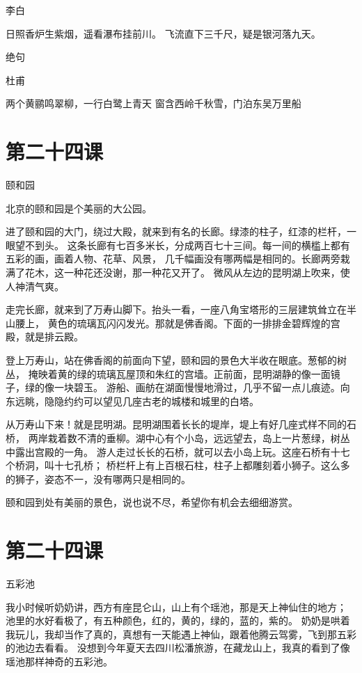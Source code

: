 \documentclass[12pt,UTF8]{ctexbook}
\begin{document}
李白

日照香炉生紫烟，遥看瀑布挂前川。
飞流直下三千尺，疑是银河落九天。

绝句

杜甫

两个黄鹂鸣翠柳，一行白鹭上青天
窗含西岭千秋雪，门泊东吴万里船

\section{第二十四课}

颐和园

北京的颐和园是个美丽的大公园。

进了颐和园的大门，绕过大殿，就来到有名的长廊。绿漆的柱子，红漆的栏杆，一眼望不到头。
这条长廊有七百多米长，分成两百七十三间。每一间的横槛上都有五彩的画，画着人物、花草、风景，
几千幅画没有哪两幅是相同的。长廊两旁栽满了花木，这一种花还没谢，那一种花又开了。
微风从左边的昆明湖上吹来，使人神清气爽。

走完长廊，就来到了万寿山脚下。抬头一看，一座八角宝塔形的三层建筑耸立在半山腰上，
黄色的琉璃瓦闪闪发光。那就是佛香阁。下面的一排排金碧辉煌的宫殿，就是排云殿。

登上万寿山，站在佛香阁的前面向下望，颐和园的景色大半收在眼底。葱郁的树丛，
掩映着黄的绿的琉璃瓦屋顶和朱红的宫墙。正前面，昆明湖静的像一面镜子，绿的像一块碧玉。
游船、画舫在湖面慢慢地滑过，几乎不留一点儿痕迹。向东远眺，隐隐约约可以望见几座古老的城楼和城里的白塔。

从万寿山下来！就是昆明湖。昆明湖围着长长的堤岸，堤上有好几座式样不同的石桥，
两岸栽着数不清的垂柳。湖中心有个小岛，远远望去，岛上一片葱绿，树丛中露出宫殿的一角。
游人走过长长的石桥，就可以去小岛上玩。这座石桥有十七个桥洞，叫十七孔桥；
桥栏杆上有上百根石柱，柱子上都雕刻着小狮子。这么多的狮子，姿态不一，没有哪两只是相同的。

颐和园到处有美丽的景色，说也说不尽，希望你有机会去细细游赏。

\section{第二十四课}

五彩池

我小时候听奶奶讲，西方有座昆仑山，山上有个瑶池，那是天上神仙住的地方；
池里的水好看极了，有五种颜色，红的，黄的，绿的，蓝的，紫的。
奶奶是哄着我玩儿，我却当作了真的，真想有一天能遇上神仙，跟着他腾云驾雾，飞到那五彩的池边去看看。
没想到今年夏天去四川松潘旅游，在藏龙山上，我真的看到了像瑶池那样神奇的五彩池。
\end{document}
